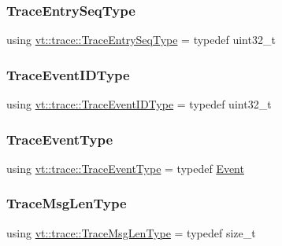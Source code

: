 \subsubsection{\texorpdfstring{Trace\+Entry\+Seq\+Type}{TraceEntrySeqType}}
{\footnotesize\ttfamily using \hyperlink{namespacevt_1_1trace_a522028dd2a7d056f0ec3d417836fdecd}{vt\+::trace\+::\+Trace\+Entry\+Seq\+Type} = typedef uint32\+\_\+t}

\mbox{\label{namespacevt_1_1trace_a64a7185f3e102df8d8258f263ccd1582}} 
\subsubsection{\texorpdfstring{Trace\+Event\+I\+D\+Type}{TraceEventIDType}}
{\footnotesize\ttfamily using \hyperlink{namespacevt_1_1trace_a64a7185f3e102df8d8258f263ccd1582}{vt\+::trace\+::\+Trace\+Event\+I\+D\+Type} = typedef uint32\+\_\+t}

\mbox{\label{namespacevt_1_1trace_a79b7fa947245c08d04a3ea67fbff2c30}} 
\subsubsection{\texorpdfstring{Trace\+Event\+Type}{TraceEventType}}
{\footnotesize\ttfamily using \hyperlink{namespacevt_1_1trace_a79b7fa947245c08d04a3ea67fbff2c30}{vt\+::trace\+::\+Trace\+Event\+Type} = typedef \hyperlink{structvt_1_1trace_1_1_event}{Event}}

\mbox{\label{namespacevt_1_1trace_aeb598f45d67d41db7902e494f2f0ce59}} 
\subsubsection{\texorpdfstring{Trace\+Msg\+Len\+Type}{TraceMsgLenType}}
{\footnotesize\ttfamily using \hyperlink{namespacevt_1_1trace_aeb598f45d67d41db7902e494f2f0ce59}{vt\+::trace\+::\+Trace\+Msg\+Len\+Type} = typedef size\+\_\+t}

